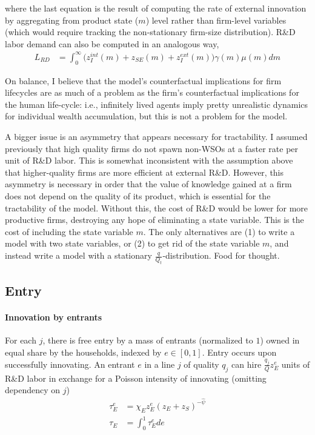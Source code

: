 \documentclass[12pt,english]{article}
\theoremstyle{remark}
\begin{document}
where the last equation is the result of computing the rate of external innovation by aggregating from product state ($m$) level rather than firm-level variables (which would require tracking the non-stationary firm-size distribution). R\&D labor demand can also be computed in an analogous way,
\begin{align*}
	L_{RD} &= \int_0^{\infty} \Big( z_I^{int}(m) + z_{SE}(m) + z_I^{ext}(m) \Big) \gamma(m) \mu(m) dm
\end{align*}

On balance, I believe that the model's counterfactual implications for firm lifecycles are as much of a problem as the firm's counterfactual implications for the human life-cycle: i.e., infinitely lived agents imply pretty unrealistic dynamics for individual wealth accumulation, but this is not a problem for the model. 

A bigger issue is an asymmetry that appears necessary for tractability. I assumed previously that high quality firms do not spawn non-WSOs at a faster rate per unit of R\&D labor. This is somewhat inconsistent with the assumption above that higher-quality firms are more efficient at external R\&D. However, this asymmetry is necessary in order that the value of knowledge gained at a firm does not depend on the quality of its product, which is essential for the tractability of the model. Without this, the cost of R\&D would be lower for more productive firms, destroying any hope of eliminating a state variable. This is the cost of including the state variable $m$. The only alternatives are (1) to write a model with two state variables, or (2) to get rid of the state variable $m$, and instead write a model with a stationary $\frac{q}{Q_t}$-distribution. Food for thought.


\subsection{Entry} 

\paragraph{Innovation by entrants} For each $j$, there is free entry by a mass of entrants (normalized to $1$) owned in equal share by the households, indexed by $e \in [0,1]$. Entry occurs upon successfully innovating. An entrant $e$ in a line $j$ of quality $q_j$ can hire $\frac{q_j}{Q} z_E^e$ units of R\&D labor in exchange for a Poisson intensity of innovating (omitting dependency on $j$)
\begin{align}
\tau_E^e &= \chi_E z_E^e (z_E + z_S)^{-\hat{\psi}} \label{simplified_entrant_innovation_rate} \\
\tau_E &= \int_0^1 \tau_E^e de \nonumber
\end{align}
\end{document}
